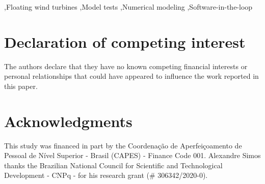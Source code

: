 \documentclass[a4paper,fleqn]{cas-sc}
\let\Oldsection\section
\renewcommand{\section}{\FloatBarrier\Oldsection}
\begin{document}



\begin{keywords}
    \sep Floating wind turbines \sep Model tests \sep Numerical modeling \sep Software-in-the-loop
\end{keywords}
  
\maketitle

\linenumbers







\printcredits

\section*{Declaration of competing interest}
The authors declare that they have no known competing financial interests or personal relationships that could have appeared to influence the work reported in this paper.

\section*{Acknowledgments}
This study was financed in part by the Coordenação de Aperfeiçoamento de Pessoal de Nível Superior - Brasil (CAPES) - Finance Code 001. Alexandre Simos thanks the Brazilian National Council for Scientific and Technological Development - CNPq - for his research grant (\# 306342/2020-0). 

%





%
\end{document}
